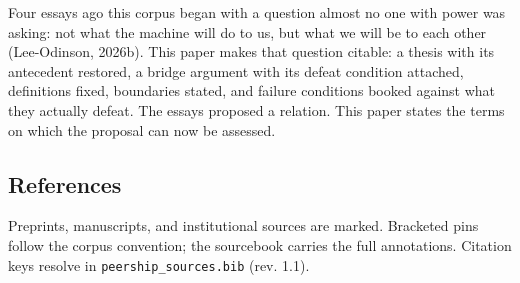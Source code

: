 \documentclass[
  11pt,
  letterpaper,
]{article}
\begin{document}
Four essays ago this corpus began with a question almost no one with
power was asking: not what the machine will do to us, but what we will
be to each other (Lee-Odinson, 2026b). This paper makes that question
citable: a thesis with its antecedent restored, a bridge argument with
its defeat condition attached, definitions fixed, boundaries stated, and
failure conditions booked against what they actually defeat. The essays
proposed a relation. This paper states the terms on which the proposal
can now be assessed.

\hypertarget{references}{%
\subsection{References}\label{references}}

Preprints, manuscripts, and institutional sources are marked. Bracketed
pins follow the corpus convention; the sourcebook carries the full
annotations. Citation keys resolve in \texttt{peership\_sources.bib}
(rev. 1.1).


\end{document}
